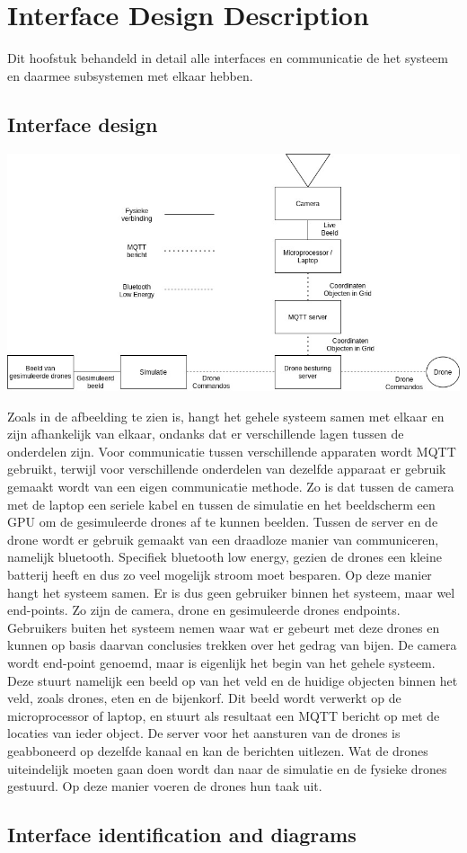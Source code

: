 \section{Interface Design Description}
Dit hoofstuk behandeld in detail alle interfaces en communicatie de het systeem
en daarmee subsystemen met elkaar hebben.

\subsection{Interface design}
\begin{center}
\hspace*{-3.5cm}\includegraphics[width=1.6\textwidth]{../IMAGES/IDD.jpg}
\end{center}
	Zoals in de afbeelding te zien is, hangt het gehele systeem samen met elkaar en zijn afhankelijk van elkaar, ondanks dat er verschillende lagen tussen de onderdelen zijn. Voor communicatie tussen verschillende apparaten wordt MQTT gebruikt, terwijl voor verschillende onderdelen van dezelfde apparaat er gebruik gemaakt wordt van een eigen communicatie methode. Zo is dat tussen de camera met de laptop een seriele kabel en tussen de simulatie en het beeldscherm een GPU om de gesimuleerde drones af te kunnen beelden. Tussen de server en de drone wordt er gebruik gemaakt van een draadloze manier van communiceren, namelijk bluetooth. Specifiek bluetooth low energy, gezien de drones een kleine batterij heeft en dus zo veel mogelijk stroom moet besparen. Op deze manier hangt het systeem samen. Er is dus geen gebruiker binnen het systeem, maar wel end-points. Zo zijn de camera, drone en gesimuleerde drones endpoints. Gebruikers buiten het systeem nemen waar wat er gebeurt met deze drones en kunnen op basis daarvan conclusies trekken over het gedrag van bijen. De camera wordt end-point genoemd, maar is eigenlijk het begin van het gehele systeem. Deze stuurt namelijk een beeld op van het veld en de huidige objecten binnen het veld, zoals drones, eten en de bijenkorf. Dit beeld wordt verwerkt op de microprocessor of laptop, en stuurt als resultaat een MQTT bericht op met de locaties van ieder object. De server voor het aansturen van de drones is geabboneerd op dezelfde kanaal en kan de berichten uitlezen. Wat de drones uiteindelijk moeten gaan doen wordt dan naar de simulatie en de fysieke drones gestuurd. Op deze manier voeren de drones hun taak uit.

\subsection{Interface identification and diagrams}
